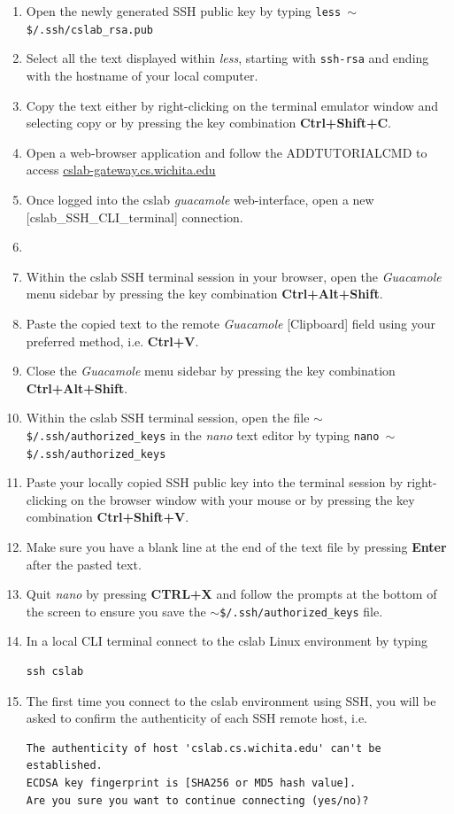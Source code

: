 \documentclass[12pt]{article}
\begin{document}
\begin{enumerate}
  \item Open the newly generated SSH public key by typing \break
  \texttt{less $\sim$\$/.ssh/cslab\_rsa.pub}
  \item Select all the text displayed within \textit{less}, starting with \texttt{ssh-rsa} and ending with the hostname of your local computer.
  \item Copy the text either by right-clicking on the terminal emulator window and selecting copy or by pressing the key combination \textbf{Ctrl+Shift+C}.
  \item Open a web-browser application and follow the ADDTUTORIALCMD to access \href{https://cslab-gateway.cs.wichita.edu/}{cslab-gateway.cs.wichita.edu}
  \item Once logged into the cslab \textit{guacamole} web-interface, open a new [cslab\_SSH\_CLI\_terminal] connection.
  \item
  \item Within the cslab SSH terminal session in your browser, open the \textit{Guacamole} menu sidebar by pressing the key combination \textbf{Ctrl+Alt+Shift}.
  \item Paste the copied text to the remote \textit{Guacamole} [Clipboard] field using your preferred method, i.e. \textbf{Ctrl+V}.
  \item Close the \textit{Guacamole} menu sidebar by pressing the key combination \textbf{Ctrl+Alt+Shift}.
  \item Within the cslab SSH terminal session, open the file \texttt{$\sim$\$/.ssh/authorized\_keys} in the \textit{nano} text editor by typing \break
  \texttt{nano $\sim$\$/.ssh/authorized\_keys}
  \item Paste your locally copied SSH public key into the terminal session by right-clicking on the browser window with your mouse or by pressing the key combination \textbf{Ctrl+Shift+V}.
  \item Make sure you have a blank line at the end of the text file by pressing \textbf{Enter} after the pasted text.
  \item Quit \textit{nano} by pressing \textbf{CTRL+X} and follow the prompts at the bottom of the screen to ensure you save the \texttt{$\sim$\$/.ssh/authorized\_keys} file.
    
  \item In a local CLI terminal connect to the cslab Linux environment by typing
\begin{verbatim}
ssh cslab
\end{verbatim}
\item The first time you connect to the cslab environment using SSH, you will be asked to confirm the authenticity of each SSH remote host, i.e.
\begin{verbatim}
The authenticity of host 'cslab.cs.wichita.edu' can't be established.
ECDSA key fingerprint is [SHA256 or MD5 hash value].
Are you sure you want to continue connecting (yes/no)?
\end{verbatim}


\end{enumerate}
\end{document}
